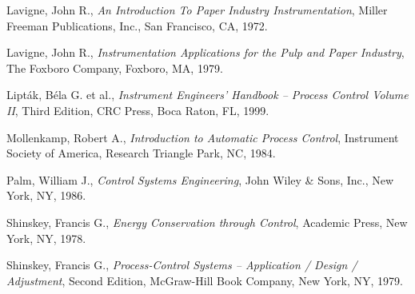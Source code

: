 \noindent
Lavigne, John R., \textit{An Introduction To Paper Industry Instrumentation}, Miller Freeman Publications, Inc., San Francisco, CA, 1972.

\vskip 10pt

\noindent
Lavigne, John R., \textit{Instrumentation Applications for the Pulp and Paper Industry}, The Foxboro Company, Foxboro, MA, 1979.

\vskip 10pt

\noindent
Lipt\'ak, B\'ela G. et al., \textit{Instrument Engineers' Handbook -- Process Control Volume II}, Third Edition, CRC Press, Boca Raton, FL, 1999.

\vskip 10pt

\noindent
Mollenkamp, Robert A., \textit{Introduction to Automatic Process Control}, Instrument Society of America, Research Triangle Park, NC, 1984. 

\vskip 10pt

\noindent
Palm, William J., \textit{Control Systems Engineering}, John Wiley \& Sons, Inc., New York, NY, 1986. 

\vskip 10pt

\noindent
Shinskey, Francis G., \textit{Energy Conservation through Control}, Academic Press, New York, NY, 1978. 

\vskip 10pt

\noindent
Shinskey, Francis G., \textit{Process-Control Systems -- Application / Design / Adjustment}, Second Edition, McGraw-Hill Book Company, New York, NY, 1979. 


















%

